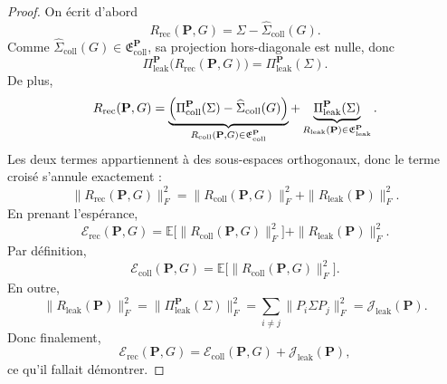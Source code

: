 \documentclass[11pt,a4paper]{article}
\newtheorem{remark}{Remarque}[section]
\newcommand{\1}{\mathbf 1}
\begin{document}
\begin{proof}
On écrit d'abord
\[
R_{\mathrm{rec}}(\mathbf P,G)
=
\Sigma-\widehat \Sigma_{\mathrm{coll}}(G).
\]
Comme \(\widehat \Sigma_{\mathrm{coll}}(G)\in \mathfrak E_{\mathrm{coll}}^{\mathbf P}\), sa projection hors-diagonale est nulle, donc
\[
\Pi_{\mathrm{leak}}^{\mathbf P}\!\bigl(R_{\mathrm{rec}}(\mathbf P,G)\bigr)
=
\Pi_{\mathrm{leak}}^{\mathbf P}(\Sigma).
\]
De plus,
\[
R_{\mathrm{rec}}(\mathbf P,G)
=
\underbrace{\Bigl(\Pi_{\mathrm{coll}}^{\mathbf P}(\Sigma)-\widehat \Sigma_{\mathrm{coll}}(G)\Bigr)}_{R_{\mathrm{coll}}(\mathbf P,G)\in\mathfrak E_{\mathrm{coll}}^{\mathbf P}}
+
\underbrace{\Pi_{\mathrm{leak}}^{\mathbf P}(\Sigma)}_{R_{\mathrm{leak}}(\mathbf P)\in\mathfrak E_{\mathrm{leak}}^{\mathbf P}}.
\]
Les deux termes appartiennent à des sous-espaces orthogonaux, donc le terme croisé s'annule exactement :
\[
\|R_{\mathrm{rec}}(\mathbf P,G)\|_F^2
=
\|R_{\mathrm{coll}}(\mathbf P,G)\|_F^2
+
\|R_{\mathrm{leak}}(\mathbf P)\|_F^2.
\]
En prenant l'espérance,
\[
\mathcal E_{\mathrm{rec}}(\mathbf P,G)
=
\mathbb E\bigl[\|R_{\mathrm{coll}}(\mathbf P,G)\|_F^2\bigr]
+
\|R_{\mathrm{leak}}(\mathbf P)\|_F^2.
\]
Par définition,
\[
\mathcal E_{\mathrm{coll}}(\mathbf P,G)
=
\mathbb E\bigl[\|R_{\mathrm{coll}}(\mathbf P,G)\|_F^2\bigr].
\]
En outre,
\[
\|R_{\mathrm{leak}}(\mathbf P)\|_F^2
=
\bigl\|\Pi_{\mathrm{leak}}^{\mathbf P}(\Sigma)\bigr\|_F^2
=
\sum_{i\neq j}\|P_i\Sigma P_j\|_F^2
=
\mathcal J_{\mathrm{leak}}(\mathbf P).
\]
Donc finalement,
\[
\mathcal E_{\mathrm{rec}}(\mathbf P,G)
=
\mathcal E_{\mathrm{coll}}(\mathbf P,G)
+
\mathcal J_{\mathrm{leak}}(\mathbf P),
\]
ce qu'il fallait démontrer.
\end{proof}



\end{document}
